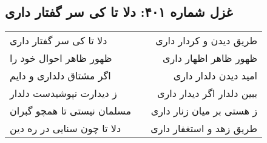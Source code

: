 \begin{center}
\section*{غزل شماره ۴۰۱: دلا تا کی سر گفتار داری}
\label{sec:401}
\begin{longtable}{l p{0.5cm} r}
دلا تا کی سر گفتار داری
&&
طریق دیدن و کردار داری
\\
ظهور ظاهر احوال خود را
&&
ظهور ظاهر اظهار داری
\\
اگر مشتاق دلداری و دایم
&&
امید دیدن دلدار داری
\\
ز دیدارت نپوشیدست دلدار
&&
ببین دلدار اگر دیدار داری
\\
مسلمان نیستی تا همچو گبران
&&
ز هستی بر میان زنار داری
\\
دلا تا چون سنایی در ره دین
&&
طریق زهد و استغفار داری
\\
\end{longtable}
\end{center}
